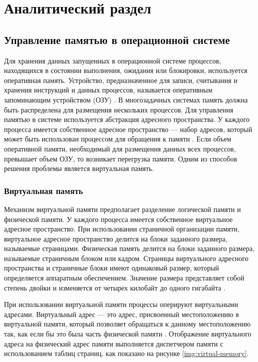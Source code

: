\chapter{Аналитический раздел}

\section{Управление памятью в операционной системе}

Для хранения данных запущенных в операционной системе процессов, находящихся в состоянии выполнения, ожидания или блокировки, используется оперативная память. Устройство, предназначенное для записи, считывания и хранения инструкций и данных процессов, называется оперативным запоминающим устройством (ОЗУ) \cite{ram}. В многозадачных системах память должна быть распределена для размещения нескольких процессов. Для управления памятью в системе используется абстракция адресного пространства. У каждого процесса имеется собственное адресное пространство --- набор адресов, который может быть использован процессом для обращения к памяти \cite{address-space}. Если объем оперативной памяти, необходимый для размещения данных всех процессов, превышает объем ОЗУ, то возникает перегрузка памяти. Одним из способов решения проблемы является виртуальная память.

\subsection{Виртуальная память}

Механизм виртуальной памяти предполагает разделение логической памяти и физической памяти. У каждого процесса имеется собственное виртуальное адресное пространство. При использовании страничной организации памяти, виртуальное адресное пространство делится на блоки заданного размера, называемые страницами. Физическая память делится на блоки заданного размера, называемые страничным блоком или кадром. Страницы виртуального адресного пространства и страничные блоки имеют одинаковый размер, который определяется аппаратным обеспечением. Значение размера представляет собой степень двойки и изменяется от четырех килобайт до одного гигабайта \cite{swapping}.

При использовании виртуальной памяти процессы оперируют виртуальными адресами. Виртуальный адрес --- это адрес, присвоенный местоположению в виртуальной памяти, который позволяет обращаться к данному местоположению так, как если бы это была часть физической памяти \cite{address-space}. Отображение виртуального адреса на физический адрес памяти выполняется диспетчером памяти с использованием таблиц страниц, как показано на рисунке \ref{img:virtual-memory}.


